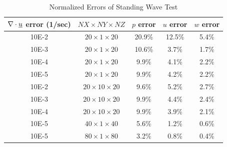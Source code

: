 \begin{table}[hbtp]
\begin{center}
\caption{Normalized Errors of Standing Wave Test}
\label{tab:StnWav-Summary}
\small
\begin{tabular}{ccccc} \hline %
$\nabla \cdot \underline u$ error (1/sec)& $NX \times NY \times NZ$   & $p$ error  & $u$ error & $w$ error \\ \hline
10E-2  &  $20 \times 1 \times 20$   &   20.9\%  &  12.5\%  &  5.4\% \\
10E-3  &  $20 \times 1 \times 20$   &   10.6\%  &  3.7\%   & 1.7\% \\
10E-4  &  $20 \times 1 \times 20$   &    9.9\%  &  4.1\%   & 2.2\% \\
10E-5  &  $20 \times 1 \times 20$   &    9.9\%  &  4.2\%   & 2.2\% \\
10E-2  &  $20 \times 10 \times 20$  &    9.6\%  &  5.2\%   & 2.7\% \\
10E-3  &  $20 \times 10 \times 20$  &    9.9\%  &  4.4\%   & 2.4\% \\
10E-4  &  $20 \times 10 \times 20$  &    9.9\%  &  3.9\%   & 2.1\% \\
10E-5  &  $40 \times 1  \times 40$  &    5.6\%  &  1.2\%   & 0.6\% \\
10E-5  &  $80 \times 1 \times  80$  &    3.2\%  &  0.8\%   & 0.4\% \\
\hline
\end{tabular}
\end{center}
\end{table}

\cp

